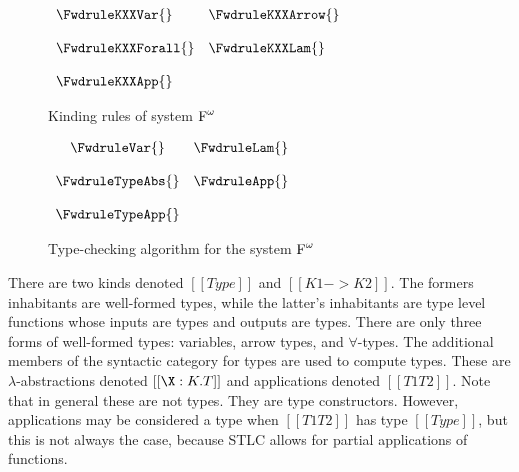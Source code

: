 \begin{figure}
  \begin{center}
    \begin{math}
      \begin{array}{lll}
        \FwdruleKXXVar{} &  \FwdruleKXXArrow{}\\
        & \\
        \FwdruleKXXForall{} & \FwdruleKXXLam{}\\
        & \\
        \FwdruleKXXApp{}
      \end{array}
    \end{math}
  \end{center}
  \caption{Kinding rules of system $\text{F}^\omega$}
  \label{fig:Fw_kinding}
\end{figure}
\begin{figure}
  \begin{center}
    \begin{math}
      \begin{array}{ccc}
        \FwdruleVar{} &  \FwdruleLam{}\\
        & \\
        \FwdruleTypeAbs{} & \FwdruleApp{}\\
        & \\
        \FwdruleTypeApp{}
      \end{array}
    \end{math}
  \end{center}
  \caption{Type-checking algorithm for the system $\text{F}^\omega$}
  \label{fig:Fw_typing}
\end{figure}
There are two kinds denoted $[[Type]]$ and $[[K1 -> K2]]$.  The
formers inhabitants are well-formed types, while the latter's
inhabitants are type level functions whose inputs are types and
outputs are types.  There are only three forms of well-formed types:
variables, arrow types, and $\forall$-types.  The additional members
of the syntactic category for types are used to compute types.  These
are $\lambda$-abstractions denoted $[[\X:K.T]]$ and applications
denoted $[[T1 T2]]$.  Note that in general these are not types.  They
are type constructors.  However, applications may be considered a type
when $[[T1 T2]]$ has type $[[Type]]$, but this is not always the case,
because STLC allows for partial applications of functions.

